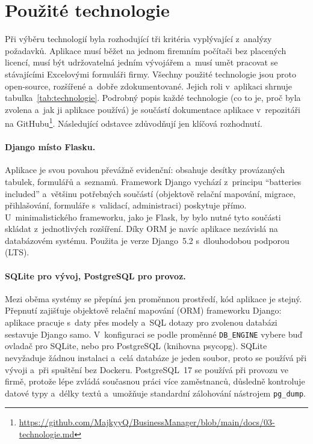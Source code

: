 \section{Použité technologie}\label{sec:technologie}

Při výběru technologií byla rozhodující tři kritéria vyplývající z~analýzy požadavků. Aplikace musí běžet na jednom firemním počítači bez placených licencí, musí být udržovatelná jedním vývojářem a~musí umět pracovat se stávajícími Excelovými formuláři firmy. Všechny použité technologie jsou proto open-source, rozšířené a~dobře zdokumentované. Jejich roli v~aplikaci shrnuje tabulka~\ref{tab:technologie}. Podrobný popis každé technologie (co to je, proč byla zvolena a~jak ji aplikace používá) je součástí dokumentace aplikace v~repozitáři na GitHubu\footnote{\url{https://github.com/MajkyyQ/BusinessManager/blob/main/docs/03-technologie.md}}. Následující odstavce zdůvodňují jen klíčová rozhodnutí.

\paragraph{Django místo Flasku.} Aplikace je svou povahou převážně evidenční: obsahuje desítky provázaných tabulek, formulářů a~seznamů. Framework Django vychází z~principu \enquote{batteries included} a~většinu potřebných součástí (objektově relační mapování, migrace, přihlašování, formuláře s~validací, administraci) poskytuje přímo. U~minimalistického frameworku, jako je Flask, by bylo nutné tyto součásti skládat z~jednotlivých rozšíření. Díky ORM je navíc aplikace nezávislá na databázovém systému. Použita je verze Django~5.2 s~dlouhodobou podporou (LTS).

\paragraph{SQLite pro vývoj, PostgreSQL pro provoz.} Mezi oběma systémy se přepíná jen proměnnou prostředí, kód aplikace je stejný. Přepnutí zajišťuje objektově relační mapování (ORM) frameworku Django: aplikace pracuje s~daty přes modely a~SQL dotazy pro zvolenou databázi sestavuje Django samo. V~konfiguraci se podle proměnné \texttt{DB\_ENGINE} vybere buď ovladač pro SQLite, nebo pro PostgreSQL (knihovna psycopg). SQLite nevyžaduje žádnou instalaci a~celá databáze je jeden soubor, proto se používá při vývoji a~při spuštění bez Dockeru. PostgreSQL~17 se používá při provozu ve firmě, protože lépe zvládá současnou práci více zaměstnanců, důsledně kontroluje datové typy a~délky textů a~umožňuje standardní zálohování nástrojem \texttt{pg\_dump}.

